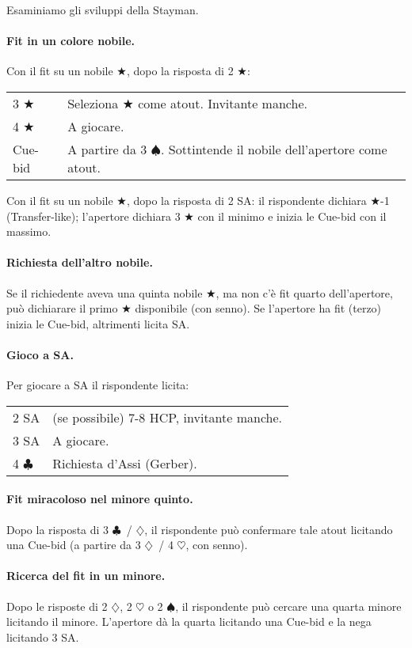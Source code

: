 \documentclass[a4paper,10pt]{article}
\renewcommand{\c}{$\clubsuit$\xspace}
\renewcommand{\d}{$\diamondsuit$\xspace}
\newcommand{\h}{$\heartsuit$\xspace}
\newcommand{\s}{$\spadesuit$\xspace}
\renewcommand{\j}{$\bigstar$\xspace}
\newcommand{\sa}{SA\xspace}
\newcommand{\smallspace}{\vskip0.3cm}
\newenvironment{twocol}
  {\smallspace\noindent\begin{tabular}{l p{0.78\textwidth}}}
  {\end{tabular}\smallspace}
\begin{document}
\noindent Esaminiamo gli sviluppi della Stayman.

\paragraph{Fit in un colore nobile.}

Con il fit su un nobile \j, dopo la risposta di 2 \j:
\begin{twocol}
 3 \j & Seleziona \j come atout. Invitante manche.\\
 4 \j & A giocare.\\
 Cue-bid & A partire da 3 \s. Sottintende il nobile dell'apertore come atout.\\
\end{twocol}

\noindent Con il fit su un nobile \j, dopo la risposta di 2 \sa: il rispondente dichiara \j-1 (Transfer-like); l'apertore dichiara 3 \j con il minimo e inizia le Cue-bid con il massimo.


\paragraph{Richiesta dell'altro nobile.}
Se il richiedente aveva una quinta nobile \j, ma non c'è fit quarto dell'apertore, può dichiarare il primo \j disponibile (con senno). Se l'apertore ha fit (terzo) inizia le Cue-bid, altrimenti licita \sa.

\paragraph{Gioco a SA.}
Per giocare a SA il rispondente licita:
\begin{twocol}
 2 \sa & (se possibile) 7-8 HCP, invitante manche.\\
 3 \sa & A giocare.\\
 4 \c & Richiesta d'Assi (Gerber).
\end{twocol}

\paragraph{Fit miracoloso nel minore quinto.}
Dopo la risposta di 3 \c\ / \d, il rispondente può confermare tale atout licitando una Cue-bid (a partire da 3 \d\ / 4 \h, con senno).


\paragraph{Ricerca del fit in un minore.}
Dopo le risposte di 2 \d, 2 \h o 2 \s, il rispondente può cercare una quarta minore licitando il minore. L'apertore dà la quarta licitando una Cue-bid e la nega licitando 3 \sa.
\end{document}
